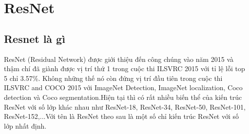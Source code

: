 \section{ResNet}
\subsection{Resnet là gì}
ResNet (Residual Network) được giới thiệu đến công chúng vào năm 2015 và thậm chí đã giành được vị trí thứ 1 trong cuộc thi ILSVRC 2015 với tỉ lệ lỗi top 5 chỉ 3.57\%. Không những thế nó còn đứng vị trí đầu tiên trong cuộc thi ILSVRC and COCO 2015 với ImageNet Detection, ImageNet localization, Coco detection và Coco segmentation.Hiện tại thì có rất nhiều biến thể của kiến trúc ResNet với số lớp khác nhau như ResNet-18, ResNet-34, ResNet-50, ResNet-101, ResNet-152,...Với tên là ResNet theo sau là một số chỉ kiến trúc ResNet với số lớp nhất định.

